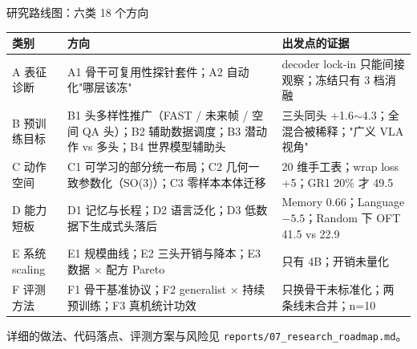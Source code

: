 \documentclass[aspectratio=169,10pt]{beamer}
\begin{document}
\begin{frame}{研究路线图：六类 18 个方向}
  \begin{center}\footnotesize
  \begin{tabular}{p{2.2cm}p{5.4cm}p{6.0cm}}
    \toprule
    类别 & 方向 & 出发点的证据 \\
    \midrule
    A 表征诊断 & A1 骨干可复用性探针套件；A2 自动化"哪层该冻" & decoder lock-in 只能间接观察；冻结只有 3 档消融 \\
    B 预训练目标 & B1 头多样性推广（FAST / 未来帧 / 空间 QA 头）；B2 辅助数据调度；B3 潜动作 vs 多头；B4 世界模型辅助头 & 三头同头 +1.6$\sim$4.3；全混合被稀释；"广义 VLA 视角" \\
    C 动作空间 & C1 可学习的部分统一布局；C2 几何一致参数化（SO(3)）；C3 零样本本体迁移 & 20 维手工表；wrap loss +5；GR1 20\% 才 49.5 \\
    D 能力短板 & D1 记忆与长程；D2 语言泛化；D3 低数据下生成式头落后 & Memory 0.66；Language $-5.5$；Random 下 OFT 41.5 vs 22.9 \\
    E 系统 scaling & E1 规模曲线；E2 三头开销与降本；E3 数据 $\times$ 配方 Pareto & 只有 4B；开销未量化 \\
    F 评测方法 & F1 骨干基准协议；F2 generalist $\times$ 持续预训练；F3 真机统计功效 & 只换骨干未标准化；两条线未合并；n=10 \\
    \bottomrule
  \end{tabular}
  \end{center}
  \vspace{4pt}
  详细的做法、代码落点、评测方案与风险见 \texttt{reports/07\_research\_roadmap.md}。
\end{frame}
\end{document}
